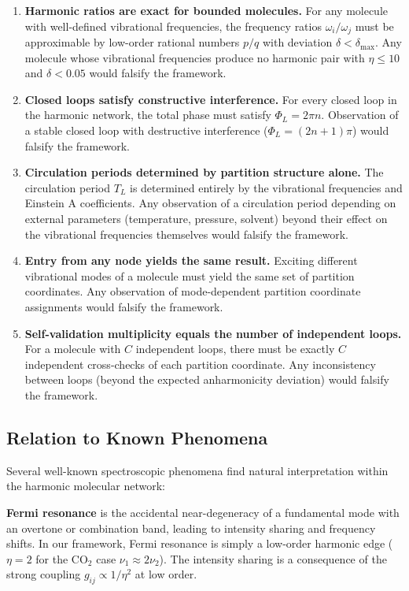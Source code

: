 \documentclass[11pt,twocolumn,a4paper]{article}
\theoremstyle{definition}
\theoremstyle{remark}
\begin{document}
\begin{enumerate}
\item \textbf{Harmonic ratios are exact for bounded molecules.} For any molecule with well-defined vibrational frequencies, the frequency ratios $\omega_i/\omega_j$ must be approximable by low-order rational numbers $p/q$ with deviation $\delta < \delta_{\max}$. Any molecule whose vibrational frequencies produce no harmonic pair with $\eta \leq 10$ and $\delta < 0.05$ would falsify the framework.

\item \textbf{Closed loops satisfy constructive interference.} For every closed loop in the harmonic network, the total phase must satisfy $\Phi_L = 2\pi n$. Observation of a stable closed loop with destructive interference ($\Phi_L = (2n+1)\pi$) would falsify the framework.

\item \textbf{Circulation periods determined by partition structure alone.} The circulation period $T_L$ is determined entirely by the vibrational frequencies and Einstein A coefficients. Any observation of a circulation period depending on external parameters (temperature, pressure, solvent) beyond their effect on the vibrational frequencies themselves would falsify the framework.

\item \textbf{Entry from any node yields the same result.} Exciting different vibrational modes of a molecule must yield the same set of partition coordinates. Any observation of mode-dependent partition coordinate assignments would falsify the framework.

\item \textbf{Self-validation multiplicity equals the number of independent loops.} For a molecule with $C$ independent loops, there must be exactly $C$ independent cross-checks of each partition coordinate. Any inconsistency between loops (beyond the expected anharmonicity deviation) would falsify the framework.
\end{enumerate}

\subsection{Relation to Known Phenomena}

Several well-known spectroscopic phenomena find natural interpretation within the harmonic molecular network:

\textbf{Fermi resonance} \citep{fermi1931} is the accidental near-degeneracy of a fundamental mode with an overtone or combination band, leading to intensity sharing and frequency shifts. In our framework, Fermi resonance is simply a low-order harmonic edge ($\eta = 2$ for the CO$_2$ case $\nu_1 \approx 2\nu_2$). The intensity sharing is a consequence of the strong coupling $g_{ij} \propto 1/\eta^2$ at low order.
\end{document}
